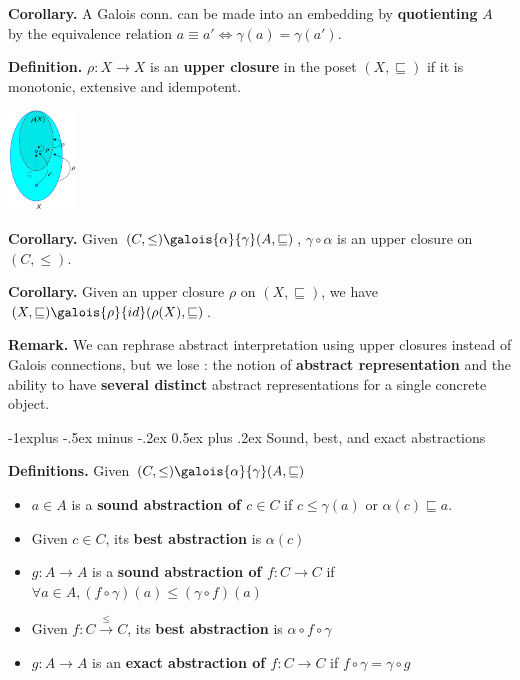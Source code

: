\documentclass[10pt,landscape]{article}
\makeatletter
\renewcommand{\subsection}{\@startsection{subsection}{2}{0mm}%
                                {-1explus -.5ex minus -.2ex}%
                                {0.5ex plus .2ex}%
                                {\normalfont\normalsize\bfseries}}
\makeatother
\begin{document}
\begin{multicols}{3}
\textbf{Corollary.} A Galois conn. can be made into an embedding by \textbf{quotienting} $A$ by the equivalence relation $a \equiv a' \Leftrightarrow \gamma (a) = \gamma (a')$.

\textbf{Definition.} $\rho : X \rightarrow X$ is an \textbf{upper closure} in the poset $(X, \sqsubseteq)$ if it is monotonic, extensive and idempotent.

\begin{center}
  \includegraphics[height=100px]{figures/upper_closure.png}
\end{center}


\textbf{Corollary.} Given $(C, \leq) \galois{\alpha}{\gamma} (A, \sqsubseteq)$, $\gamma \circ \alpha$ is an upper closure on $(C, \leq)$.

\textbf{Corollary.} Given an upper closure $\rho$ on $(X, \sqsubseteq)$, we have $(X, \sqsubseteq) \galois{\rho}{id} (\rho (X), \sqsubseteq)$.

\textbf{Remark.} We can rephrase abstract interpretation using upper closures instead of Galois connections, but we lose : the notion of \textbf{abstract representation} and the ability to have \textbf{several distinct} abstract representations for a single concrete object.

\subsection{Sound, best, and exact abstractions}

\textbf{Definitions.} Given $(C, \leq) \galois{\alpha}{\gamma} (A, \sqsubseteq)$
\begin{itemize}\setlength{\itemsep}{-0.7mm}
\item $a \in A$ is a \textbf{sound abstraction of $c \in C$} if $c \leq \gamma(a)$ or $\alpha (c) \sqsubseteq a$.
\item Given $c \in C$, its \textbf{best abstraction} is $\alpha (c)$
\item $g : A \rightarrow A$ is a \textbf{sound abstraction of $f : C \rightarrow C$} if $\forall a \in A, (f \circ \gamma)(a) \leq (\gamma \circ f)(a)$
\item Given $f : C \overset{\leq}{\rightarrow} C$, its \textbf{best abstraction} is $\alpha \circ f \circ \gamma$
\item $g : A \rightarrow A$ is an \textbf{exact abstraction of $f : C \rightarrow C$} if $f \circ \gamma = \gamma \circ g$
\end{itemize}


\end{multicols}
\end{document}
